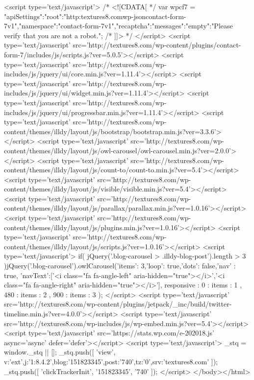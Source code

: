 <script type='text/javascript'>
/* <![CDATA[ */
var wpcf7 = {"apiSettings":{"root":"http:\/\/textures8.com\/wp-json\/contact-form-7\/v1","namespace":"contact-form-7\/v1"},"recaptcha":{"messages":{"empty":"Please verify that you are not a robot."}}};
/* ]]> */
</script>
<script type='text/javascript' src='http://textures8.com/wp-content/plugins/contact-form-7/includes/js/scripts.js?ver=5.0.5'></script>
<script type='text/javascript' src='http://textures8.com/wp-includes/js/jquery/ui/core.min.js?ver=1.11.4'></script>
<script type='text/javascript' src='http://textures8.com/wp-includes/js/jquery/ui/widget.min.js?ver=1.11.4'></script>
<script type='text/javascript' src='http://textures8.com/wp-includes/js/jquery/ui/progressbar.min.js?ver=1.11.4'></script>
<script type='text/javascript' src='http://textures8.com/wp-content/themes/illdy/layout/js/bootstrap/bootstrap.min.js?ver=3.3.6'></script>
<script type='text/javascript' src='http://textures8.com/wp-content/themes/illdy/layout/js/owl-carousel/owl-carousel.min.js?ver=2.0.0'></script>
<script type='text/javascript' src='http://textures8.com/wp-content/themes/illdy/layout/js/count-to/count-to.min.js?ver=5.4'></script>
<script type='text/javascript' src='http://textures8.com/wp-content/themes/illdy/layout/js/visible/visible.min.js?ver=5.4'></script>
<script type='text/javascript' src='http://textures8.com/wp-content/themes/illdy/layout/js/parallax/parallax.min.js?ver=1.0.16'></script>
<script type='text/javascript' src='http://textures8.com/wp-content/themes/illdy/layout/js/plugins.min.js?ver=1.0.16'></script>
<script type='text/javascript' src='http://textures8.com/wp-content/themes/illdy/layout/js/scripts.js?ver=1.0.16'></script>
<script type='text/javascript'>
if( jQuery('.blog-carousel > .illdy-blog-post').length > 3 ){jQuery('.blog-carousel').owlCarousel({'items': 3,'loop': true,'dots': false,'nav' : true, 'navText':['<i class="fa fa-angle-left" aria-hidden="true"></i>','<i class="fa fa-angle-right" aria-hidden="true"></i>'], responsive : { 0 : { items : 1 }, 480 : { items : 2 }, 900 : { items : 3 } }});}
</script>
<script type='text/javascript' src='http://textures8.com/wp-content/plugins/jetpack/_inc/build/twitter-timeline.min.js?ver=4.0.0'></script>
<script type='text/javascript' src='http://textures8.com/wp-includes/js/wp-embed.min.js?ver=5.4'></script>
<script type='text/javascript' src='https://stats.wp.com/e-202018.js' async='async' defer='defer'></script>
<script type='text/javascript'>
	_stq = window._stq || [];
	_stq.push([ 'view', {v:'ext',j:'1:8.4.2',blog:'151823345',post:'740',tz:'0',srv:'textures8.com'} ]);
	_stq.push([ 'clickTrackerInit', '151823345', '740' ]);
</script>
</body></html>
